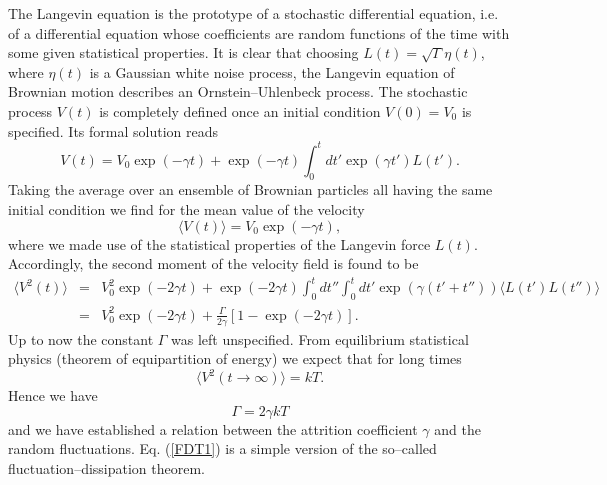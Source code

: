 The Langevin equation is the prototype of a stochastic 
differential equation, i.e. of a differential equation whose
coefficients are random functions of the time with some given
statistical properties. 
It is clear that choosing $L(t)=\sqrt{\Gamma} \eta(t)$,
where $\eta(t)$ is a Gaussian white noise process, the Langevin 
equation of Brownian motion describes an Ornstein--Uhlenbeck
process.
The stochastic process $V(t)$ is 
completely defined once an initial condition $V(0)=V_0$ is specified.
Its formal solution reads
\begin{equation*}
V(t) = V_0 \exp(-\gamma t) + \exp(-\gamma t) 
    \int_0^t dt' \exp(\gamma t') L(t').
\end{equation*}
Taking the average over an ensemble of Brownian particles all
having the same initial condition we find for the mean value of 
the velocity
\begin{equation*}
\langle V(t) \rangle = V_0 \exp(-\gamma t),
\end{equation*}
where we made use of the statistical properties of the Langevin 
force $L(t)$. Accordingly, the second moment of the velocity field
is found to be
\begin{eqnarray*}
\langle V^2(t) \rangle &=& V_0^2 \exp(-2\gamma t)
          + \exp(-2 \gamma t) \int_0^t dt'' \int_0^t dt'
             \exp(\gamma (t' + t'')) \langle L(t') L(t'') \rangle 
             \\
          &=& V_0^2 \exp(-2\gamma t) + \frac{\Gamma}{2 \gamma}
             [1-\exp(-2 \gamma t)].
\end{eqnarray*}
Up to now the constant $\Gamma$ was left unspecified. From 
equilibrium statistical physics (theorem of equipartition of energy) 
we  expect that for long times 
\begin{equation*}
\langle V^2(t\rightarrow \infty) \rangle = kT.
\end{equation*}
Hence we have
\begin{equation}
\label{FDT1}
\Gamma = 2 \gamma kT
\end{equation}
and we have established a relation between the attrition 
coefficient $\gamma$ and the random fluctuations.
Eq. (\ref{FDT1}) is a simple version of the so--called
fluctuation--dissipation theorem.


